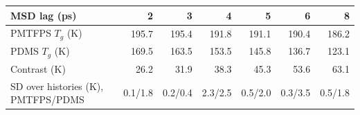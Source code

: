 \begin{tabular}{lrrrrrr}
\toprule
MSD lag (ps) & 2 & 3 & 4 & 5 & 6 & 8 \\
\midrule
PMTFPS $T_g$ (K) & 195.7 & 195.4 & 191.8 & 191.1 & 190.4 & 186.2 \\
PDMS $T_g$ (K) & 169.5 & 163.5 & 153.5 & 145.8 & 136.7 & 123.1 \\
Contrast (K) & 26.2 & 31.9 & 38.3 & 45.3 & 53.6 & 63.1 \\
SD over histories (K), PMTFPS/PDMS & 0.1/1.8 & 0.2/0.4 & 2.3/2.5 & 0.5/2.0 & 0.3/3.5 & 0.5/1.8 \\
\bottomrule
\end{tabular}
